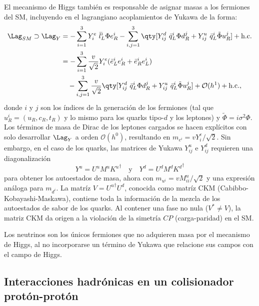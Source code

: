 El mecanismo de Higgs también es responsable de asignar masas a los fermiones del SM, incluyendo en el lagrangiano acoplamientos de Yukawa de la forma:
\begin{align*}
  \Lag_{SM} \supset \Lag_{Y} &= -\sum_{i = 1}^3 Y^e_{i} \ \bar{l}_L^i \Phi e_R^i -\sum_{i,j =1}^3 \qty[ Y_{ij}^d \ \bar{q}_L^i \Phi d^j_R + Y_{ij}^u \ \bar{q}_L^i \tilde{\Phi} u^j_R ] + \text{h.c.} \\
    &= -\sum_{i = 1}^3 \frac{v}{\sqrt{2}} Y^e_{i} (\bar{e}_L^i e_R^i + \bar{e}_R^i e_L^i) \\
    &\quad - \sum_{i,j =1}^3 \frac{v}{\sqrt{2}} \qty[ Y_{ij}^d \ \bar{q}_L^i \Phi d^j_R + Y_{ij}^u \ \bar{q}_L^i \tilde{\Phi} u^j_R ] + \mathcal{O}(h^1) + \text{h.c.},
\end{align*}
donde $i$ y $j$ son los índices de la generación de los fermiones (tal que $u^i_R = (u_R, c_R, t_R)$ y lo mismo para los quarks tipo-$d$ y los leptones) y $\tilde{\Phi} = i \sigma^2 \Phi$. Los términos de masa de Dirac de los leptones cargados se hacen explícitos con solo desarrollar $\Lag_Y$ a orden $\mathcal{O}(h^0)$, resultando en $m_{e^i} = v Y^e_i / \sqrt{2}$. Sin embargo, en el caso de los quarks, las matrices de Yukawa $Y^u_{ij}$ e $Y^d_{ij}$ requieren una diagonalización
\[ Y^u = U^u M^u {K^u}^\dagger \quad \text{y} \quad Y^d = U^d M^d {K^d}^\dagger \]
para obtener los autoestados de masa, ahora con $m_{u^i} = v M^u_{ii} /\sqrt{2}$ y una expresión análoga para $m_{d^i}$. La matríz $V = {U^u}^\dagger U^d$, conocida como matríz CKM (Cabibbo-Kobayashi-Maskawa), contiene toda la información de la mezcla de los autoestados de sabor de los quarks. Al contener una fase no nula ($V^* \neq V$), la matriz CKM da origen a la violación de la simetría $CP$ (carga-paridad) en el SM.

Los neutrinos son los únicos fermiones que no adquieren masa por el mecanismo de Higgs, al no incorporarse un término de Yukawa que relacione sus campos con el campo de Higgs.










\subsection{Interacciones hadrónicas en un colisionador protón-protón} \label{sec:ch1:SM:had_interactions}

